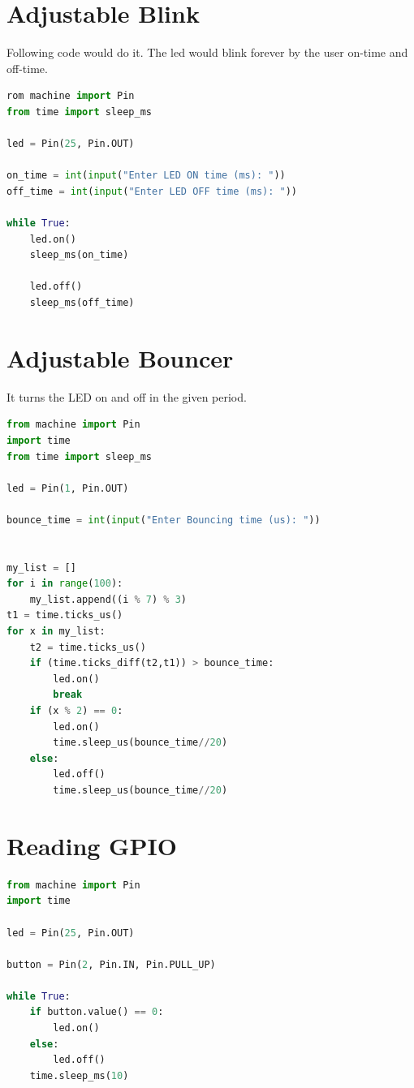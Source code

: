 \documentclass[12pt]{article}
\begin{document}
	
	\newpage
	\pagestyle{fancy}
	\fancyhf{}
	\cfoot{\thepage}
	


	
	
\section{Adjustable Blink}
Following code would do it. The led would blink forever by the user on-time and off-time.
\begin{lstlisting}[language=Python]
rom machine import Pin
from time import sleep_ms

led = Pin(25, Pin.OUT)

on_time = int(input("Enter LED ON time (ms): "))
off_time = int(input("Enter LED OFF time (ms): "))

while True:
	led.on()
	sleep_ms(on_time)

	led.off()
	sleep_ms(off_time)
\end{lstlisting}

\section{Adjustable Bouncer}
It turns the LED on and off in the given period.
\begin{lstlisting}[language=Python]
from machine import Pin
import time
from time import sleep_ms

led = Pin(1, Pin.OUT)

bounce_time = int(input("Enter Bouncing time (us): "))


my_list = []
for i in range(100):
	my_list.append((i % 7) % 3)
t1 = time.ticks_us()
for x in my_list:
	t2 = time.ticks_us()
	if (time.ticks_diff(t2,t1)) > bounce_time:
		led.on()
		break
	if (x % 2) == 0:
		led.on()
		time.sleep_us(bounce_time//20)
	else:
		led.off()
		time.sleep_us(bounce_time//20)
\end{lstlisting}
\section{Reading GPIO}

\begin{lstlisting}[language=Python]
from machine import Pin
import time

led = Pin(25, Pin.OUT)

button = Pin(2, Pin.IN, Pin.PULL_UP)

while True:
	if button.value() == 0:
		led.on()   
	else:
		led.off()  
	time.sleep_ms(10)

\end{lstlisting}
\end{document}
